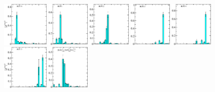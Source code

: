 \begin{figure}[H]
    \includegraphics[width=0.1975\textwidth]{figures/sigmas/g1u/zfactors/zfactor_isotriplet-S-1-P000-G1u_1-ROT-0.pdf}
    \includegraphics[width=0.18\textwidth]{figures/sigmas/g1u/zfactors/zfactor_isotriplet-S-1-P000-G1u_1-ROT-1.pdf}
    \includegraphics[width=0.18\textwidth]{figures/sigmas/g1u/zfactors/zfactor_isotriplet-S-1-P000-G1u_1-ROT-2.pdf}
    \includegraphics[width=0.18\textwidth]{figures/sigmas/g1u/zfactors/zfactor_isotriplet-S-1-P000-G1u_1-ROT-3.pdf}
    \includegraphics[width=0.18\textwidth]{figures/sigmas/g1u/zfactors/zfactor_isotriplet-S-1-P000-G1u_1-ROT-4.pdf}\\
    \includegraphics[width=0.1975\textwidth]{figures/sigmas/g1u/zfactors/zfactor_isotriplet-S-1-P000-G1u_1-ROT-5.pdf}
    \includegraphics[width=0.18\textwidth]{figures/sigmas/g1u/zfactors/zfactor_isotriplet_kaon_xi-G1u_1-P000-A1u-SS_0-P000-G1g-SS_0.pdf}

\end{figure}
